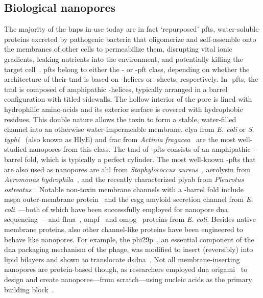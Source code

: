 \subsection{Biological nanopores}
%

The majority of the \glspl{bnp} in-use today are in fact `repurposed' \glspl{pft}, water-soluble proteins
excreted by pathogenic bacteria that oligomerize and self-assemble onto the membranes of other cells to
permeabilize them, disrupting vital ionic gradients, leaking nutrients into the environment, and potentially
killing the target cell~\cite{Peraro-2015}. \Glspl{pft} belong to either the \ta- or \tb-\gls{pft} class,
depending on whether the architecture of their \gls{tmd} is based on \ta-helices or \tb-sheets, respectively.
In \ta-\glspl{pft}, the \gls{tmd} is composed of amphipathic \ta-helices, typically arranged in a barrel
configuration with titled sidewalls. The hollow interior of the pore is lined with hydrophilic amino-acids and
its exterior surface is covered with hydrophobic residues. This double nature allows the toxin to form a
stable, water-filled channel into an otherwise water-impermeable membrane. \Gls{clya} from \textit{E. coli} or
\textit{S. typhi}~\cite{Mueller-2009} (also known as HlyE) and \gls{frac} from \textit{Actinia
fragacea}~\cite{Tanaka-2015} are the most well-studied nanopores from this class. The \gls{tmd} of
\tb-\glspl{pft} consists of an amphipathic \tb-barrel fold, which is typically a perfect cylinder. The most
well-known \tb-\glspl{pft} that are also used as nanopores are \gls{ahl} from \textit{Staphylococcus
aureus}~\cite{Song-1996}, aerolysin from \textit{Aeromonas hydrophila}~\cite{Iacovache-2016}, and the recently
characterized \gls{plyab} from \textit{Pleurotus ostreatus}~\cite{Lukoyanova-Kondos-2015}. Notable non-toxin
membrane channels with a \tb-barrel fold include \gls{mspa} outer-membrane protein~\cite{Faller-2004} and the
\gls{csgg} amyloid secretion channel from \textit{E. coli}~\cite{Goyal-2014}---both of which have been
successfully employed for nanopore \gls{dna} sequencing~\cite{Manrao-2012,Brown-2016}---and
\gls{fhua}~\cite{Locher-1998}, \gls{ompf}~\cite{Yamashita-2008} and \gls{ompg}~\cite{Subbarao-2006} proteins
from \textit{E. coli}. Besides native membrane proteins, also other channel-like proteins have been engineered
to behave like nanopores. For example, the \gls{phi29p}~\cite{Xu-2019}, an essential component of the
\gls{dna} packaging mechanism of the  phage, was modified to insert (reversibly) into lipid bilayers
and shown to translocate \gls{dsdna}~\cite{Wendell-2009}. Not all membrane-inserting nanopores are
protein-based though, as researchers employed \gls{dna} origami~\cite{Rothemund-2006} to design and create
nanopores---from scratch---using nucleic acids as the primary building
block~\cite{Bell-2011,Langecker-2012,Burns-2013,Bell-2014,Gopfrich-2016,Gopfrich-2019}.


